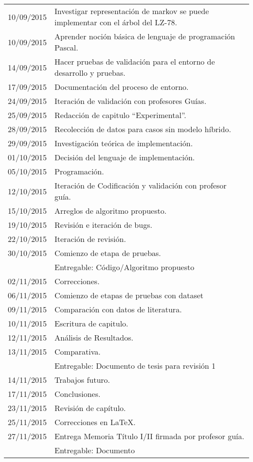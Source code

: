 \documentclass{udparticle}
\begin{document}
\begin{center}
\begin{tabular}{ll}
  		10/09/2015 & Investigar representación de markov se puede implementar con el árbol del LZ-78.\\
  		10/09/2015 & Aprender noción básica de lenguaje de programación Pascal.\\
  		14/09/2015 & Hacer pruebas de validación para el entorno de desarrollo y pruebas.\\
  		17/09/2015 & Documentación del proceso de entorno.\\
  		24/09/2015 & Iteración de validación con profesores Guías.\\
  		25/09/2015 & Redacción de capitulo ``Experimental''.\\
  		28/09/2015 & Recolección de datos para casos sin modelo híbrido.\\
  		29/09/2015 & Investigación teórica de implementación.\\
  		
  		01/10/2015 & Decisión del lenguaje de implementación.\\
  		05/10/2015 & Programación. \\
  		12/10/2015 & Iteración de Codificación y validación con profesor guía.\\
  		15/10/2015 & Arreglos de algoritmo propuesto.\\
  		19/10/2015 & Revisión e iteración de bugs. \\
  		22/10/2015 & Iteración de revisión. \\
  		30/10/2015 & Comienzo de etapa de pruebas.\\
  		& Entregable: Código/Algoritmo propuesto \\
  		
  		02/11/2015 & Correcciones. \\
  		06/11/2015 & Comienzo de etapas de pruebas con dataset\\
  		09/11/2015 & Comparación con datos de literatura.\\
  		10/11/2015 & Escritura de capitulo.\\
  		12/11/2015 & Análisis de Resultados.\\
  		13/11/2015 & Comparativa.\\
  		& Entregable: Documento de tesis para revisión 1 \\
  		14/11/2015 & Trabajos futuro.\\
  		17/11/2015 & Conclusiones.\\
  		23/11/2015 & Revisión de capítulo.\\
  		25/11/2015 & Correcciones en \LaTeX. \\
  		27/11/2015 & Entrega Memoria Título I/II firmada por profesor guía.\\
  		& Entregable: Documento\\ 
  		

\end{tabular}
\end{center}
\end{document}
